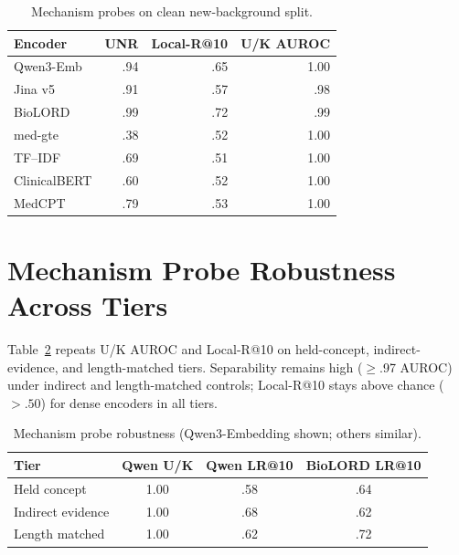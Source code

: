 \documentclass[11pt]{article}
\begin{document}
\begin{table}[!htbp]
  \centering
  \scriptsize
  \renewcommand{\arraystretch}{1.06}
  \caption{Mechanism probes on clean new-background split.}
  \label{tab:mechanism_clean}
  \begin{tabular*}{\columnwidth}{@{\extracolsep{\fill}}lrrr@{}}
    \toprule
    \textbf{Encoder} & \textbf{UNR} & \textbf{Local-R@10} &
    \textbf{U/K AUROC} \\
    \midrule
    Qwen3-Emb    & .94 & .65 & 1.00 \\
    Jina v5      & .91 & .57 & .98 \\
    BioLORD      & .99 & .72 & .99 \\
    med-gte      & .38 & .52 & 1.00 \\
    TF--IDF      & .69 & .51 & 1.00 \\
    ClinicalBERT & .60 & .52 & 1.00 \\
    MedCPT       & .79 & .53 & 1.00 \\
    \bottomrule
  \end{tabular*}
\end{table}

\section{Mechanism Probe Robustness Across Tiers}
\label{app:mechanism_robust}

Table~\ref{tab:mechanism_robust} repeats U/K AUROC and Local-R@10 on
held-concept, indirect-evidence, and length-matched tiers. Separability
remains high ($\geq$.97 AUROC) under indirect and length-matched controls;
Local-R@10 stays above chance ($>.50$) for dense encoders in all tiers.

\begin{table}[!htbp]
  \centering
  \scriptsize
  \renewcommand{\arraystretch}{1.06}
  \caption{Mechanism probe robustness (Qwen3-Embedding shown; others similar).}
  \label{tab:mechanism_robust}
  \begin{tabular*}{\columnwidth}{@{\extracolsep{\fill}}lccc@{}}
    \toprule
    \textbf{Tier} & \textbf{Qwen U/K} & \textbf{Qwen LR@10} &
    \textbf{BioLORD LR@10} \\
    \midrule
    Held concept      & 1.00 & .58 & .64 \\
    Indirect evidence & 1.00 & .68 & .62 \\
    Length matched    & 1.00 & .62 & .72 \\
    \bottomrule
  \end{tabular*}
\end{table}
\end{document}
